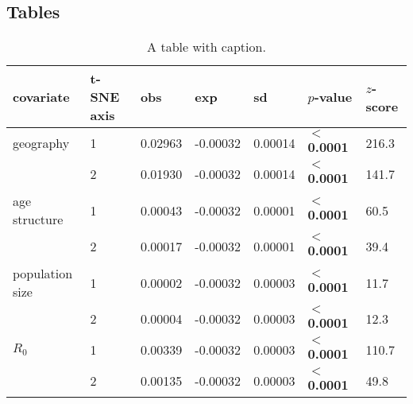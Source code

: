 \documentclass[12pt]{article}
\begin{document}
\paragraph*{}








\paragraph*{}




















\clearpage










\clearpage
\subsection*{Tables}


\begin{table}[ht]
\centering
\caption{A table with caption. }
\label{tab:moran}
\begin{tabular}{lllllll}
  \hline
  covariate & t-SNE axis & obs & exp & sd & $p$-value & $z$-score \\
  \hline
  geography       & 1 & 0.02963 & -0.00032 & 0.00014 & \textbf{$<$ 0.0001} & 216.3 \\
                  & 2 & 0.01930 & -0.00032 & 0.00014 & \textbf{$<$ 0.0001} & 141.7 \\
  age structure   & 1 & 0.00043 & -0.00032 & 0.00001 & \textbf{$<$ 0.0001} & 60.5  \\
                  & 2 & 0.00017 & -0.00032 & 0.00001 & \textbf{$<$ 0.0001} & 39.4  \\
  population size & 1 & 0.00002 & -0.00032 & 0.00003 & \textbf{$<$ 0.0001} & 11.7  \\
                  & 2 & 0.00004 & -0.00032 & 0.00003 & \textbf{$<$ 0.0001} & 12.3  \\
  $R_0$           & 1 & 0.00339 & -0.00032 & 0.00003 & \textbf{$<$ 0.0001} & 110.7 \\
                  & 2 & 0.00135 & -0.00032 & 0.00003 & \textbf{$<$ 0.0001} & 49.8  \\

 \hline
\end{tabular}
\end{table}
\end{document}
